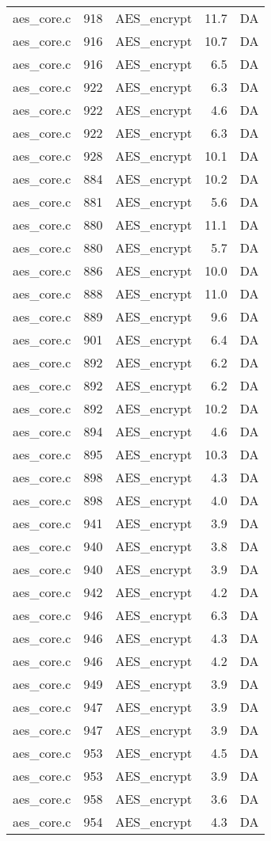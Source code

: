 \begin{table}[!ht]
\begin{tabular}{lrlrr}
aes\_core.c& 918&AES\_encrypt&11.7 &DA\\
aes\_core.c& 916&AES\_encrypt&10.7 &DA\\
aes\_core.c& 916&AES\_encrypt&6.5 &DA\\
aes\_core.c& 922&AES\_encrypt&6.3 &DA\\
aes\_core.c& 922&AES\_encrypt&4.6 &DA\\
aes\_core.c& 922&AES\_encrypt&6.3 &DA\\
aes\_core.c& 928&AES\_encrypt&10.1 &DA\\
aes\_core.c& 884&AES\_encrypt&10.2 &DA\\
aes\_core.c& 881&AES\_encrypt&5.6 &DA\\
aes\_core.c& 880&AES\_encrypt&11.1 &DA\\
aes\_core.c& 880&AES\_encrypt&5.7 &DA\\
aes\_core.c& 886&AES\_encrypt&10.0 &DA\\
aes\_core.c& 888&AES\_encrypt&11.0 &DA\\
aes\_core.c& 889&AES\_encrypt&9.6 &DA\\
aes\_core.c& 901&AES\_encrypt&6.4 &DA\\
aes\_core.c& 892&AES\_encrypt&6.2 &DA\\
aes\_core.c& 892&AES\_encrypt&6.2 &DA\\
aes\_core.c& 892&AES\_encrypt&10.2 &DA\\
aes\_core.c& 894&AES\_encrypt&4.6 &DA\\
aes\_core.c& 895&AES\_encrypt&10.3 &DA\\
aes\_core.c& 898&AES\_encrypt&4.3 &DA\\
aes\_core.c& 898&AES\_encrypt&4.0 &DA\\
aes\_core.c& 941&AES\_encrypt&3.9 &DA\\
aes\_core.c& 940&AES\_encrypt&3.8 &DA\\
aes\_core.c& 940&AES\_encrypt&3.9 &DA\\
aes\_core.c& 942&AES\_encrypt&4.2 &DA\\
aes\_core.c& 946&AES\_encrypt&6.3 &DA\\
aes\_core.c& 946&AES\_encrypt&4.3 &DA\\
aes\_core.c& 946&AES\_encrypt&4.2 &DA\\
aes\_core.c& 949&AES\_encrypt&3.9 &DA\\
aes\_core.c& 947&AES\_encrypt&3.9 &DA\\
aes\_core.c& 947&AES\_encrypt&3.9 &DA\\
aes\_core.c& 953&AES\_encrypt&4.5 &DA\\
aes\_core.c& 953&AES\_encrypt&3.9 &DA\\
aes\_core.c& 958&AES\_encrypt&3.6 &DA\\
aes\_core.c& 954&AES\_encrypt&4.3 &DA\\
\hline
\end{tabular}
\renewcommand{\baselinestretch}{1.0}\selectfont
\end{table}

